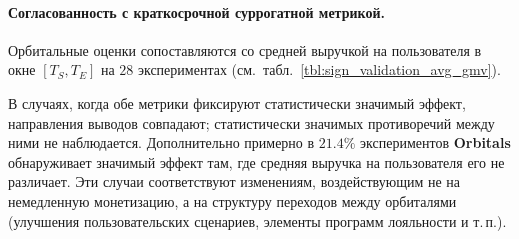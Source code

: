 \paragraph{Согласованность с краткосрочной суррогатной метрикой.}

Орбитальные оценки сопоставляются со средней выручкой на пользователя
в окне $[T_S, T_E]$ на $28$ экспериментах
(см.~табл.~\ref{tbl:sign_validation_avg_gmv}).

В случаях, когда обе метрики фиксируют статистически значимый эффект,
направления выводов совпадают; статистически значимых противоречий
между ними не наблюдается. Дополнительно примерно в $21.4\%$
экспериментов \textbf{Orbitals} обнаруживает значимый эффект там, где
средняя выручка на пользователя его не различает. Эти случаи
соответствуют изменениям, воздействующим не на немедленную
монетизацию, а на структуру переходов между орбиталями (улучшения
пользовательских сценариев, элементы программ лояльности и т.\,п.).


